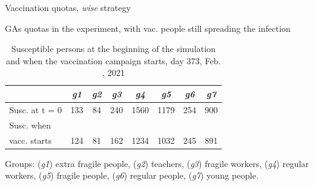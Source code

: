 \documentclass[9pt]{beamer}
\begin{document}
\begin{frame}{Vaccination quotas, \emph{wise} strategy}
\end{frame}

\begin{frame}{GAs quotas in the experiment, with vac. people still spreading the infection}

\medskip

\begin{table}[H]
\centering
\begin{small} %
\begin{tabular}{lccccccc}
\toprule
& \emph{g1} & \emph{g2} & \emph{g3} & \emph{g4} & \emph{g5} & \emph{g6} & \emph{g7} \\
\midrule
Susc. at t = 0                   & 133 & 84 & 240 & 1560 & 1179 & 254 & 900 \\
Susc. when\\vacc. starts & 124 & 81 & 162 & 1234 & 1032 & 245 & 891 \\
\bottomrule  
\end{tabular}
\end{small}
\caption{Susceptible persons at the beginning of the simulation and when the vaccination campaign starts,  day 373, Feb. , 2021}
\label{susceptibleCaseForGA_I}
\end{table}

\begin{small} %
Groups: (\emph{g1}) extra fragile people, (\emph{g2}) teachers, (\emph{g3}) fragile workers, (\emph{g4}) regular workers, (\emph{g5}) fragile people, (\emph{g6}) regular people, (\emph{g7}) young people.
\end{small}


\end{frame}
\end{document}

